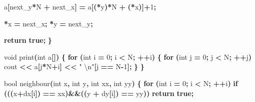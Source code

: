 \documentclass[
]{article}
\newenvironment{Shaded}{\begin{snugshade}}{\end{snugshade}}
\newcommand{\ControlFlowTok}[1]{\textcolor[rgb]{0.13,0.29,0.53}{\textbf{#1}}}
\newcommand{\DataTypeTok}[1]{\textcolor[rgb]{0.13,0.29,0.53}{#1}}
\newcommand{\DecValTok}[1]{\textcolor[rgb]{0.00,0.00,0.81}{#1}}
\newcommand{\KeywordTok}[1]{\textcolor[rgb]{0.13,0.29,0.53}{\textbf{#1}}}
\newcommand{\NormalTok}[1]{#1}
\newcommand{\OperatorTok}[1]{\textcolor[rgb]{0.81,0.36,0.00}{\textbf{#1}}}
\newcommand{\SpecialCharTok}[1]{\textcolor[rgb]{0.00,0.00,0.00}{#1}}
\newcommand{\StringTok}[1]{\textcolor[rgb]{0.31,0.60,0.02}{#1}}
\begin{document}
\begin{Shaded}
\begin{Highlighting}[]
\NormalTok{    a}\OperatorTok{[}\NormalTok{next\_y}\OperatorTok{*}\NormalTok{N }\OperatorTok{+}\NormalTok{ next\_x}\OperatorTok{]} \OperatorTok{=}\NormalTok{ a}\OperatorTok{[(*}\NormalTok{y}\OperatorTok{)*}\NormalTok{N }\OperatorTok{+} \OperatorTok{(*}\NormalTok{x}\OperatorTok{)]+}\DecValTok{1}\OperatorTok{;}

    \OperatorTok{*}\NormalTok{x }\OperatorTok{=}\NormalTok{ next\_x}\OperatorTok{;}
    \OperatorTok{*}\NormalTok{y }\OperatorTok{=}\NormalTok{ next\_y}\OperatorTok{;}

    \ControlFlowTok{return} \KeywordTok{true}\OperatorTok{;}
\OperatorTok{\}}

\DataTypeTok{void}\NormalTok{ print}\OperatorTok{(}\DataTypeTok{int}\NormalTok{ a}\OperatorTok{[])}
\OperatorTok{\{}
    \ControlFlowTok{for} \OperatorTok{(}\DataTypeTok{int}\NormalTok{ i }\OperatorTok{=} \DecValTok{0}\OperatorTok{;}\NormalTok{ i }\OperatorTok{\textless{}}\NormalTok{ N}\OperatorTok{;} \OperatorTok{++}\NormalTok{i}\OperatorTok{)}
    \OperatorTok{\{}
        \ControlFlowTok{for} \OperatorTok{(}\DataTypeTok{int}\NormalTok{ j }\OperatorTok{=} \DecValTok{0}\OperatorTok{;}\NormalTok{ j }\OperatorTok{\textless{}}\NormalTok{ N}\OperatorTok{;} \OperatorTok{++}\NormalTok{j}\OperatorTok{)}
\NormalTok{            cout }\OperatorTok{\textless{}\textless{}}\NormalTok{ a}\OperatorTok{[}\NormalTok{j}\OperatorTok{*}\NormalTok{N}\OperatorTok{+}\NormalTok{i}\OperatorTok{]} \OperatorTok{\textless{}\textless{}} \StringTok{" }\SpecialCharTok{\textbackslash{}n}\StringTok{"}\OperatorTok{[}\NormalTok{j }\OperatorTok{==}\NormalTok{ N}\OperatorTok{{-}}\DecValTok{1}\OperatorTok{];}
    \OperatorTok{\}}
\OperatorTok{\}}

\DataTypeTok{bool}\NormalTok{ neighbour}\OperatorTok{(}\DataTypeTok{int}\NormalTok{ x}\OperatorTok{,} \DataTypeTok{int}\NormalTok{ y}\OperatorTok{,} \DataTypeTok{int}\NormalTok{ xx}\OperatorTok{,} \DataTypeTok{int}\NormalTok{ yy}\OperatorTok{)}
\OperatorTok{\{}
    \ControlFlowTok{for} \OperatorTok{(}\DataTypeTok{int}\NormalTok{ i }\OperatorTok{=} \DecValTok{0}\OperatorTok{;}\NormalTok{ i }\OperatorTok{\textless{}}\NormalTok{ N}\OperatorTok{;} \OperatorTok{++}\NormalTok{i}\OperatorTok{)}
        \ControlFlowTok{if} \OperatorTok{(((}\NormalTok{x}\OperatorTok{+}\NormalTok{dx}\OperatorTok{[}\NormalTok{i}\OperatorTok{])} \OperatorTok{==}\NormalTok{ xx}\OperatorTok{)\&\&((}\NormalTok{y }\OperatorTok{+}\NormalTok{ dy}\OperatorTok{[}\NormalTok{i}\OperatorTok{])} \OperatorTok{==}\NormalTok{ yy}\OperatorTok{))}
            \ControlFlowTok{return} \KeywordTok{true}\OperatorTok{;}


\end{Highlighting}
\end{Shaded}
\end{document}
